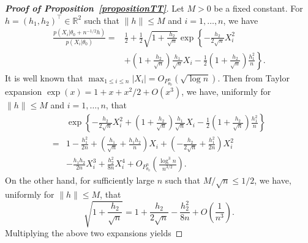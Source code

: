 \documentclass[11pt]{article}
\newcommand{\myT}{\intercal}
\theoremstyle{plain}
\theoremstyle{definition}
\theoremstyle{remark}
\begin{document}
\begin{appendices}
\begin{proof}[\textbf{Proof of Proposition~\ref{propositionTT}}]
Let $M>0$ be a fixed constant.  For $h=(h_1,h_2)^\myT \in \mathbb{R}^2$ such that $\|h\|\leq M$ and $i=1,\ldots, n$, we have
\begin{equation*}
    \begin{split}
    \frac{p(X_i|\theta_0+n^{-1/2}h)}{p(X_i|\theta_0)}
    =&
    \frac{1}{2}+\frac{1}{2}\sqrt{1+\frac{h_2}{\sqrt{n}}} \exp\left\{-\frac{h_2}{2\sqrt{n}}X_i^2
    \right.
        \\
        &\left.+\left(1+\frac{h_2}{\sqrt{n}}\right) \frac{h_1}{\sqrt{n}} X_i-\frac{1}{2}\left(1+\frac{h_2}{\sqrt{n}}\right)\frac{h_1^2}{n}\right\}.
    \end{split}
\end{equation*}
It is well known that $\max_{1\leq i\leq n}|X_i|=O_{P^n_{\theta_0}}(\sqrt{\log n})$.
Then from Taylor expansion $\exp(x)=1+x+x^2/2+O(x^3)$, we have, uniformly for $\|h\|\leq M$ and $i=1,\ldots,n$, that
\begin{align*}
    &\exp\left\{-\frac{h_2}{2\sqrt{n}}X_i^2+\left(1+\frac{h_2}{\sqrt{n}}\right) \frac{h_1}{\sqrt{n}} X_i-\frac{1}{2}\left(1+\frac{h_2}{\sqrt{n}}\right)\frac{h_1^2}{n}\right\}
    \\
    =&
1
-\frac{h_1^2}{2n}
+\left(\frac{h_1}{\sqrt{n}}+\frac{h_1 h_2}{n}\right)  X_i
+
    \left(
        -\frac{h_2}{2\sqrt{n}}
    +
     \frac{h_1^2}{2n}
\right)
    X_i^2
    \\
     &-\frac{h_1 h_2}{2n}X_i^3
    +\frac{h_2^2}{8n}X_i^4 
    +O_{P^n_{\theta_0}}\left(\frac{\log^3 n}{n^{3/2}}\right).
\end{align*}
On the other hand, for sufficiently large $n $ such that $M/\sqrt n \leq 1/2$, we have, uniformly for $\|h\|\leq M$, that
\begin{equation*}
    \sqrt{1+\frac{h_2}{\sqrt{n}}}=1+\frac{h_2}{2\sqrt{n}}-\frac{h_2^2}{8n} +O\left(\frac{1}{n^3}\right).
\end{equation*}
Multiplying the above two expansions yields

\end{proof}
\end{appendices}
\end{document}
